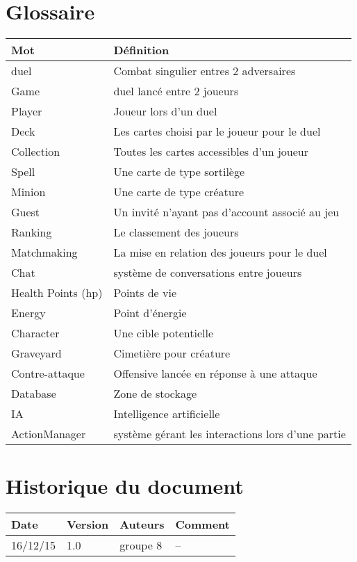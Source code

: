 \section{Glossaire}
\begin{tabular}{|l|l|}
\hline
\textbf{Mot} & \textbf{Définition} \\
\hline
duel\index{duel} & Combat singulier entres 2 adversaires \\
\hline
Game & duel\index{duel} lancé entre 2 joueurs \\
\hline
Player & Joueur lors d'un duel\index{duel} \\
\hline
Deck\index{deck} & Les cartes choisi par le joueur pour le duel\index{duel} \\
\hline
\index{collection}Collection & Toutes les cartes accessibles d'un joueur \\
\hline
Spell\index{spell} & Une carte de type sortilège \\
\hline
Minion & Une carte de type créature \\
\hline
Guest & Un invité n'ayant pas d'\index{account}account associé au jeu \\
\hline
Ranking & Le \index{classement}classement des joueurs \\
\hline
Matchmaking & La mise en relation des joueurs pour le duel\index{duel} \\
\hline
Chat & \index{système}système de conversations entre joueurs \\
\hline
Health Points (hp) & Points de vie \\
\hline
Energy & Point d'énergie \\
\hline
Character & Une cible potentielle \\
\hline
Graveyard & Cimetière pour créature \\
\hline
Contre-attaque & Offensive lancée en réponse à une attaque \\
\hline
Database & Zone de stockage \\
\hline
IA & Intelligence artificielle \\
\hline
ActionManager & \index{système}système gérant les interactions lors d'une partie \\
\hline



\end{tabular}
\section{Historique du document}
\begin{tabular}{|l|l|l|l|}
\hline \textbf{Date} &  \textbf{Version} & \textbf{Auteurs} & \textbf{Comment} \\
\hline
16/12/15 & 1.0 & groupe 8 & -- \\
\hline
\end{tabular}
